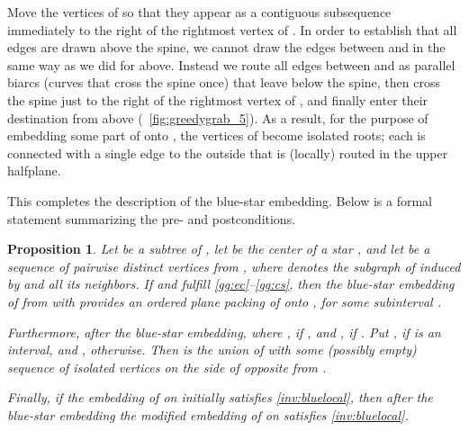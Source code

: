 \documentclass[11pt,a4paper,colorlinks=true,urlcolor=blue,citecolor=red]{article}
\theoremstyle{plain}
\newtheorem{proposition}[theorem]{Proposition}
\begin{document}
Move the vertices of  so that they appear as a contiguous
subsequence immediately to the right of the rightmost vertex  of
. In order to establish that all edges are drawn
above the spine, we cannot draw the edges between  and 
in the same way as we did for  above. Instead we route
all edges between  and  as parallel biarcs (curves that
cross the spine once) that leave  below the spine, then cross
the spine just to the right of the rightmost vertex of , and
finally enter their destination from above
(\figurename~\ref{fig:greedygrab_5}). As a result, for the purpose of
embedding some part of  onto , the vertices of 
become isolated roots; each is connected with a single edge to the
outside that is (locally) routed in the upper halfplane.

This completes the description of the blue-star embedding. Below is a
formal statement summarizing the pre- and postconditions.
\begin{proposition}\label{p:greedygrab}
  Let  be a subtree of , let  be the
  center of a star , and let  be a sequence
  of  pairwise distinct vertices from , where
   denotes the subgraph of  induced by  and all its
  neighbors. If  and  fulfill \ref{gg:ec}--\ref{gg:cs}, then
  the blue-star embedding of  from  with  provides
  an ordered plane packing of  onto , for some
  subinterval .

  Furthermore,  after the blue-star
  embedding, where , if , and , if
  . Put , if
   is an interval, and
  , otherwise. Then  is the union
  of  with some (possibly empty) sequence of isolated vertices on the
  side of  opposite from .

  Finally, if the embedding of  on  initially satisfies
  \ref{inv:bluelocal}, then after the blue-star embedding the modified
  embedding of  on  satisfies \ref{inv:bluelocal}.
\end{proposition}
\end{document}
